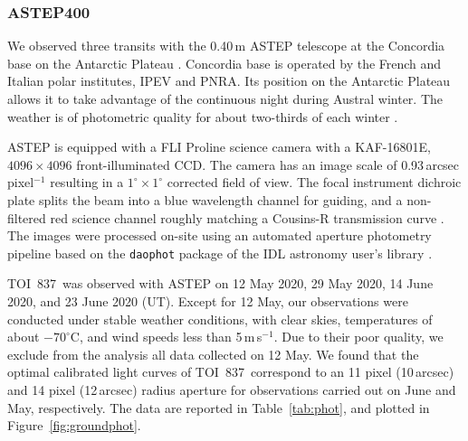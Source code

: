 \documentclass[12pt,twocolumn,tighten]{aastex63}
\newcommand{\tn}{TOI~837} %
\begin{document}


\subsubsection{ASTEP400}

We observed three transits with the 0.40$\,$m ASTEP telescope at the
Concordia base on the Antarctic Plateau \citep{daban_astep_2010}.
Concordia base is operated by the French and Italian polar institutes,
IPEV and PNRA.  Its position on the Antarctic Plateau allows it to
take advantage of the continuous night during Austral winter.  The
weather is of photometric quality for about two-thirds of each winter
\citep{crouzet_four_2018}.

ASTEP is equipped with a FLI Proline science camera with a KAF-16801E,
$4096\times4096$ front-illuminated CCD. The camera has an image scale
of 0.93\,arcsec pixel$^{-1}$ resulting in a $1^{\circ}\times1^{\circ}$
corrected field of view. The focal instrument dichroic plate splits
the beam into a blue wavelength channel for guiding, and a
non-filtered red science channel roughly matching a Cousins-R
transmission curve
\citep{abe_secondary_2013,mekarnia_transiting_2016}.  The images were
processed on-site using an automated aperture  photometry pipeline
based on the \texttt{daophot} package of the IDL astronomy user's
library \citep{landsman_1995}.

\tn\ was observed with ASTEP on 12 May 2020, 29 May 2020, 14 June
2020, and 23 June 2020 (UT).  Except for 12 May, our observations were
conducted under stable weather conditions, with clear skies,
temperatures of about $-70^\circ$C, and wind speeds less than
5\,m$\,$s$^{-1}$. Due to their poor quality, we exclude from the
analysis all data collected on 12 May. We found that the optimal
calibrated light curves of \tn\ correspond to an 11 pixel (10\,arcsec)
and 14 pixel (12\,arcsec) radius aperture for observations carried out
on June and May, respectively.  The data are reported in
Table~\ref{tab:phot}, and plotted in Figure~\ref{fig:groundphot}.
\end{document}
